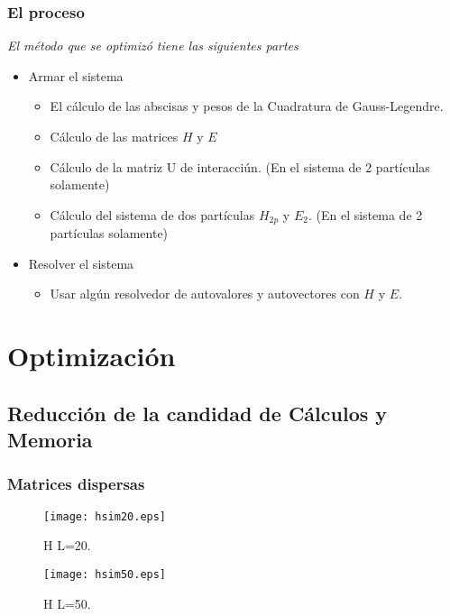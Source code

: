 \documentclass{beamer}
\begin{document}
\begin{frame}
  \frametitle{El proceso}
  \textit{El m\'etodo que se optimiz\'o tiene las siguientes partes}
  \begin{itemize}
    \item {Armar el sistema
      \begin{itemize}
        \item El c\'alculo de las abscisas y pesos de la Cuadratura de Gauss-Legendre.
        \item C\'alculo de las matrices $H$ y $E$
        \item C\'alculo de la matriz U de interacci\'un. (En el sistema de 2 part\'iculas solamente)
        \item C\'alculo del sistema de dos part\'iculas $H_{2p}$ y $E_2$. (En el sistema de 2 part\'iculas solamente)
      \end{itemize}}
    \item {Resolver el sistema
  \begin{itemize}
    \item Usar alg\'un resolvedor de autovalores y autovectores con $H$ y $E$.
  \end{itemize}
  }
  \end{itemize}
\end{frame}

\section{Optimizaci\'on}
\subsection{Reducci\'on de la candidad de C\'alculos y Memoria}

\begin{frame}
  \frametitle{Matrices dispersas}
  \begin{figure}[!tbp]
    \centering
    \begin{minipage}[b]{0.4\textwidth}
      \texttt{[image: hsim20.eps]}
      \caption{H L=20.}
    \end{minipage}
    \hfill
    \begin{minipage}[b]{0.5\textwidth}
        \texttt{[image: hsim50.eps]}
        \caption{H L=50.}
    \end{minipage}
  \end{figure}

\end{frame}
\end{document}
